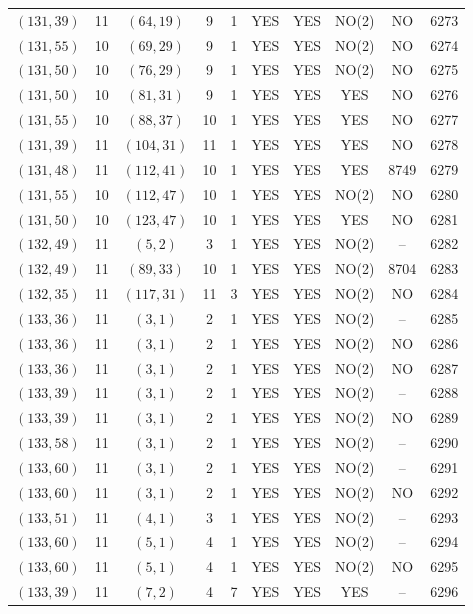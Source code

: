 \begin{longtable}{|c|c|c|c|c|c|c|c|c|c|}
$(131, 39)$ & 11 & $(64, 19)$ & 9 & 1 & YES & YES & NO(2) & NO & 6273\\
$(131, 55)$ & 10 & $(69, 29)$ & 9 & 1 & YES & YES & NO(2) & NO & 6274\\
$(131, 50)$ & 10 & $(76, 29)$ & 9 & 1 & YES & YES & NO(2) & NO & 6275\\
$(131, 50)$ & 10 & $(81, 31)$ & 9 & 1 & YES & YES & YES & NO & 6276\\
$(131, 55)$ & 10 & $(88, 37)$ & 10 & 1 & YES & YES & YES & NO & 6277\\
$(131, 39)$ & 11 & $(104, 31)$ & 11 & 1 & YES & YES & YES & NO & 6278\\
$(131, 48)$ & 11 & $(112, 41)$ & 10 & 1 & YES & YES & YES & 8749 & 6279\\
$(131, 55)$ & 10 & $(112, 47)$ & 10 & 1 & YES & YES & NO(2) & NO & 6280\\
$(131, 50)$ & 10 & $(123, 47)$ & 10 & 1 & YES & YES & YES & NO & 6281\\
$(132, 49)$ & 11 & $(5, 2)$ & 3 & 1 & YES & YES & NO(2) & -- & 6282\\
$(132, 49)$ & 11 & $(89, 33)$ & 10 & 1 & YES & YES & NO(2) & 8704 & 6283\\
$(132, 35)$ & 11 & $(117, 31)$ & 11 & 3 & YES & YES & NO(2) & NO & 6284\\
$(133, 36)$ & 11 & $(3, 1)$ & 2 & 1 & YES & YES & NO(2) & -- & 6285\\
$(133, 36)$ & 11 & $(3, 1)$ & 2 & 1 & YES & YES & NO(2) & NO & 6286\\
$(133, 36)$ & 11 & $(3, 1)$ & 2 & 1 & YES & YES & NO(2) & NO & 6287\\
$(133, 39)$ & 11 & $(3, 1)$ & 2 & 1 & YES & YES & NO(2) & -- & 6288\\
$(133, 39)$ & 11 & $(3, 1)$ & 2 & 1 & YES & YES & NO(2) & NO & 6289\\
$(133, 58)$ & 11 & $(3, 1)$ & 2 & 1 & YES & YES & NO(2) & -- & 6290\\
$(133, 60)$ & 11 & $(3, 1)$ & 2 & 1 & YES & YES & NO(2) & -- & 6291\\
$(133, 60)$ & 11 & $(3, 1)$ & 2 & 1 & YES & YES & NO(2) & NO & 6292\\
$(133, 51)$ & 11 & $(4, 1)$ & 3 & 1 & YES & YES & NO(2) & -- & 6293\\
$(133, 60)$ & 11 & $(5, 1)$ & 4 & 1 & YES & YES & NO(2) & -- & 6294\\
$(133, 60)$ & 11 & $(5, 1)$ & 4 & 1 & YES & YES & NO(2) & NO & 6295\\
$(133, 39)$ & 11 & $(7, 2)$ & 4 & 7 & YES & YES & YES & -- & 6296\\

\end{longtable}
